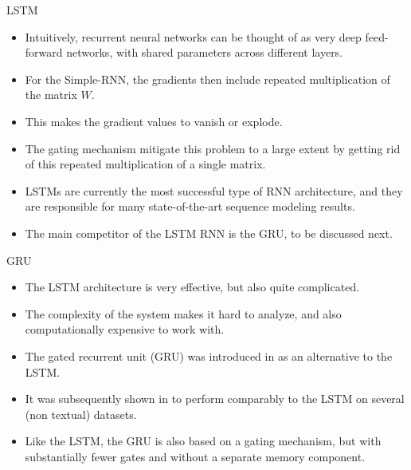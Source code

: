 \documentclass[handout]{beamer}
\begin{document}
\begin{frame}{LSTM}
\begin{scriptsize}

\begin{itemize}
\item Intuitively, recurrent neural networks can be thought of as very deep feed-forward networks, with shared parameters across different layers.
\item For the Simple-RNN, the gradients then include repeated multiplication of the matrix $W$.
\item This makes the gradient values to vanish or explode.
\item The gating mechanism mitigate this problem to a large extent by getting rid of this repeated multiplication of a single matrix.
\item LSTMs are currently the most successful type of RNN architecture, and they are responsible for many state-of-the-art sequence modeling results.
\item The main competitor of the LSTM RNN is the GRU, to be discussed next.
\end{itemize}
\end{scriptsize}
\end{frame}



\begin{frame}{GRU}
\begin{scriptsize}

\begin{itemize}
\item The LSTM architecture is very effective, but also quite complicated.
\item The complexity of the system makes it hard to analyze, and also computationally expensive to work with.
\item The gated recurrent unit (GRU) was introduced in \cite{cho2014learning} as an alternative to the LSTM.
\item It was subsequently shown in \cite{chung2014empirical} to perform comparably to the LSTM on several (non textual) datasets.
\item Like the LSTM, the GRU is also based on a gating mechanism, but with substantially fewer gates and without a separate memory component.
\end{itemize}
\end{scriptsize}
\end{frame}
\end{document}
